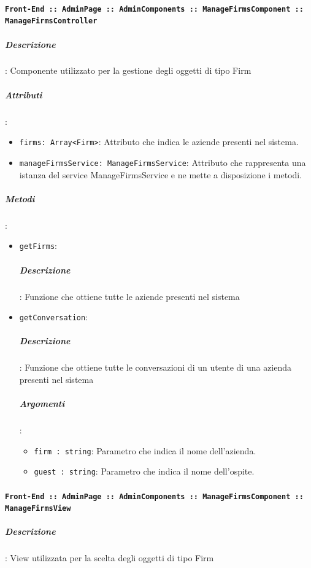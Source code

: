 \documentclass[../DefinizioneDiProdotto_v2.0.0.tex]{subfiles}
\begin{document}
				\paragraph{\texttt{Front-End :: AdminPage :: AdminComponents :: ManageFirmsComponent :: ManageFirmsController}}
					\subparagraph{Descrizione}: Componente utilizzato per la gestione degli oggetti di tipo Firm
					\subparagraph{Attributi}:
					\begin{itemize}
						\item \texttt{firms: Array<Firm>}: Attributo che indica le aziende presenti nel sistema.
						\item \texttt{manageFirmsService: ManageFirmsService}: Attributo che rappresenta una istanza del service ManageFirmsService e ne mette a disposizione i metodi.
					\end{itemize}
					\subparagraph{Metodi}:
					\begin{itemize}
						\item \texttt{getFirms}:
							\subparagraph{Descrizione}: Funzione che ottiene tutte le aziende presenti nel sistema
						\item \texttt{getConversation}:
						\subparagraph{Descrizione}: Funzione che ottiene tutte le conversazioni di un utente di una azienda presenti nel sistema
						\subparagraph{Argomenti}:
						\begin{itemize}
							\item \texttt{firm : string}: Parametro che indica il nome dell'azienda.
							\item \texttt{guest : string}: Parametro che indica il nome dell'ospite.
						\end{itemize}
					\end{itemize}

				\paragraph{\texttt{Front-End :: AdminPage :: AdminComponents :: ManageFirmsComponent :: ManageFirmsView}}
					\subparagraph{Descrizione}: View utilizzata per la scelta degli oggetti di tipo Firm


	\newpage
\end{document}
